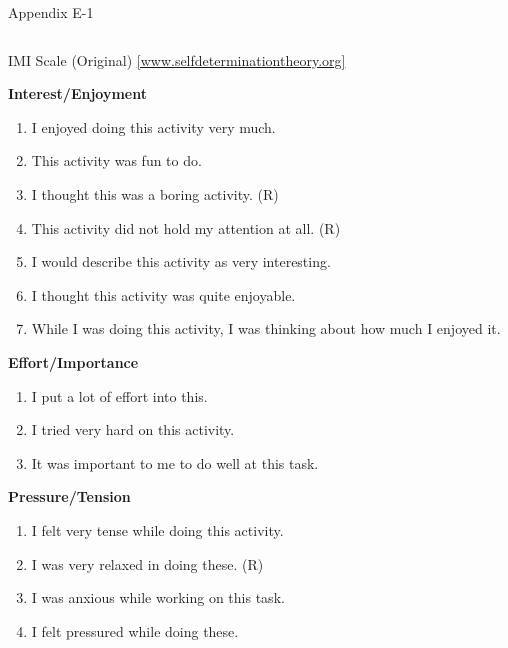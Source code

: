 \documentclass{beamer}
\begin{document}
\begin{frame}[label=appE1, plain]{Appendix E-1}
  \begin{columns}[t]
    \begin{exampleblock}{IMI Scale (Original) \href{http://www.selfdeterminationtheory.org/intrinsic-motivation-inventory/}{\tiny  [www.selfdeterminationtheory.org]}}
     \fontsize{8pt}{7.2}\selectfont

\textbf{Interest/Enjoyment}
\begin{enumerate}
\item \alert{I enjoyed doing this activity very much.}
\item \alert{This activity was fun to do.}
\item \alert{I thought this was a boring activity. (R)}
\item \alert{This activity did not hold my attention at all. (R)}
\item \alert{I would describe this activity as very interesting.}
\item \alert{I thought this activity was quite enjoyable.}
\item \alert{While I was doing this activity, I was thinking about how much I enjoyed it.}
\end{enumerate}

\textbf{Effort/Importance}
\begin{enumerate}\addtocounter{enumi}{7}
\item I put a lot of effort into this.
\item I tried very hard on this activity.
\item It was important to me to do well at this task.
\end{enumerate}

\textbf{Pressure/Tension}
\begin{enumerate}\addtocounter{enumi}{10}
\item I felt very tense while doing this activity.
\item I was very relaxed in doing these. (R)
\item I was anxious while working on this task.
\item I felt pressured while doing these.
\end{enumerate}

    \end{exampleblock}
  \end{columns}  
\end{frame}
\end{document}
